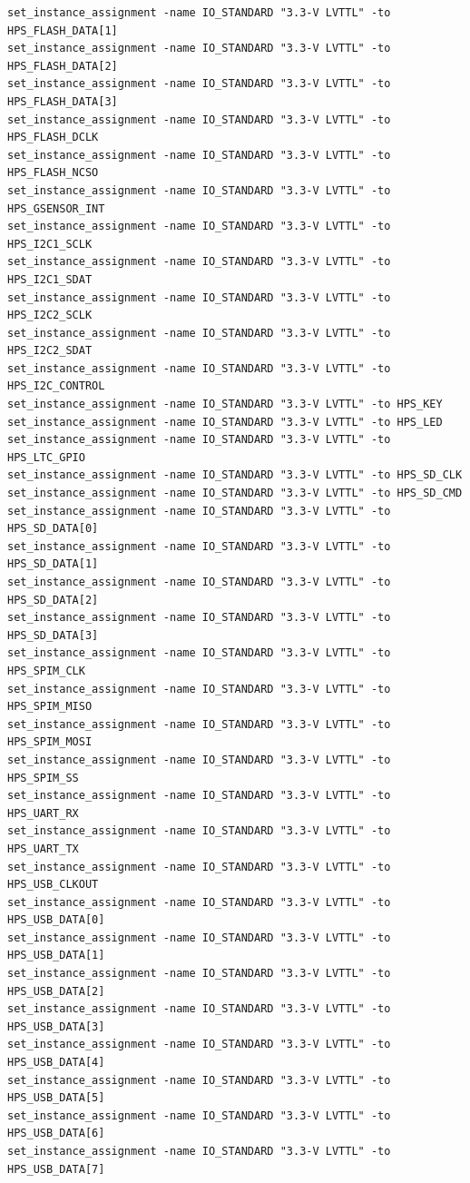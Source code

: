 \documentclass[conference]{IEEEtran}
\begin{document}
\begin{lstlisting}
set_instance_assignment -name IO_STANDARD "3.3-V LVTTL" -to HPS_FLASH_DATA[1]
set_instance_assignment -name IO_STANDARD "3.3-V LVTTL" -to HPS_FLASH_DATA[2]
set_instance_assignment -name IO_STANDARD "3.3-V LVTTL" -to HPS_FLASH_DATA[3]
set_instance_assignment -name IO_STANDARD "3.3-V LVTTL" -to HPS_FLASH_DCLK
set_instance_assignment -name IO_STANDARD "3.3-V LVTTL" -to HPS_FLASH_NCSO
set_instance_assignment -name IO_STANDARD "3.3-V LVTTL" -to HPS_GSENSOR_INT
set_instance_assignment -name IO_STANDARD "3.3-V LVTTL" -to HPS_I2C1_SCLK
set_instance_assignment -name IO_STANDARD "3.3-V LVTTL" -to HPS_I2C1_SDAT
set_instance_assignment -name IO_STANDARD "3.3-V LVTTL" -to HPS_I2C2_SCLK
set_instance_assignment -name IO_STANDARD "3.3-V LVTTL" -to HPS_I2C2_SDAT
set_instance_assignment -name IO_STANDARD "3.3-V LVTTL" -to HPS_I2C_CONTROL
set_instance_assignment -name IO_STANDARD "3.3-V LVTTL" -to HPS_KEY
set_instance_assignment -name IO_STANDARD "3.3-V LVTTL" -to HPS_LED
set_instance_assignment -name IO_STANDARD "3.3-V LVTTL" -to HPS_LTC_GPIO
set_instance_assignment -name IO_STANDARD "3.3-V LVTTL" -to HPS_SD_CLK
set_instance_assignment -name IO_STANDARD "3.3-V LVTTL" -to HPS_SD_CMD
set_instance_assignment -name IO_STANDARD "3.3-V LVTTL" -to HPS_SD_DATA[0]
set_instance_assignment -name IO_STANDARD "3.3-V LVTTL" -to HPS_SD_DATA[1]
set_instance_assignment -name IO_STANDARD "3.3-V LVTTL" -to HPS_SD_DATA[2]
set_instance_assignment -name IO_STANDARD "3.3-V LVTTL" -to HPS_SD_DATA[3]
set_instance_assignment -name IO_STANDARD "3.3-V LVTTL" -to HPS_SPIM_CLK
set_instance_assignment -name IO_STANDARD "3.3-V LVTTL" -to HPS_SPIM_MISO
set_instance_assignment -name IO_STANDARD "3.3-V LVTTL" -to HPS_SPIM_MOSI
set_instance_assignment -name IO_STANDARD "3.3-V LVTTL" -to HPS_SPIM_SS
set_instance_assignment -name IO_STANDARD "3.3-V LVTTL" -to HPS_UART_RX
set_instance_assignment -name IO_STANDARD "3.3-V LVTTL" -to HPS_UART_TX
set_instance_assignment -name IO_STANDARD "3.3-V LVTTL" -to HPS_USB_CLKOUT
set_instance_assignment -name IO_STANDARD "3.3-V LVTTL" -to HPS_USB_DATA[0]
set_instance_assignment -name IO_STANDARD "3.3-V LVTTL" -to HPS_USB_DATA[1]
set_instance_assignment -name IO_STANDARD "3.3-V LVTTL" -to HPS_USB_DATA[2]
set_instance_assignment -name IO_STANDARD "3.3-V LVTTL" -to HPS_USB_DATA[3]
set_instance_assignment -name IO_STANDARD "3.3-V LVTTL" -to HPS_USB_DATA[4]
set_instance_assignment -name IO_STANDARD "3.3-V LVTTL" -to HPS_USB_DATA[5]
set_instance_assignment -name IO_STANDARD "3.3-V LVTTL" -to HPS_USB_DATA[6]
set_instance_assignment -name IO_STANDARD "3.3-V LVTTL" -to HPS_USB_DATA[7]

\end{lstlisting}
\end{document}
